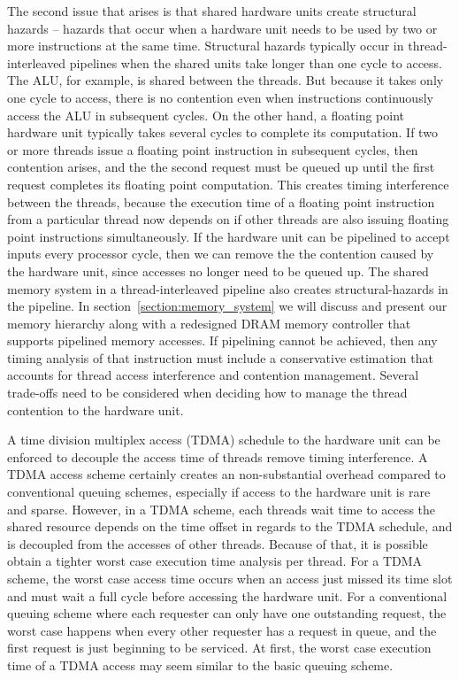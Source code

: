 The second issue that arises is that shared hardware units create structural hazards -- hazards that occur when a hardware unit needs to be used by two or more instructions at the same time.
Structural hazards typically occur in thread-interleaved pipelines when the shared units take longer than one cycle to access. 
The ALU, for example, is shared between the threads.
But because it takes only one cycle to access, there is no contention even when instructions continuously access the ALU in subsequent cycles.
On the other hand, a floating point hardware unit typically takes several cycles to complete its computation.
If two or more threads issue a floating point instruction in subsequent cycles, then contention arises, and the the second request must be queued up until the first request completes its floating point computation.   
This creates timing interference between the threads, because the execution time of a floating point instruction from a particular thread now depends on if other threads are also issuing floating point instructions simultaneously. 
If the hardware unit can be pipelined to accept inputs every processor cycle, then we can remove the the contention caused by the hardware unit, since accesses no longer need to be queued up.
The shared memory system in a thread-interleaved pipeline also creates structural-hazards in the pipeline.
In section~\ref{section:memory_system} we will discuss and present our memory hierarchy along with a redesigned DRAM memory controller that supports pipelined memory accesses.
If pipelining cannot be achieved, then any timing analysis of that instruction must include a conservative estimation that accounts for thread access interference and contention management.
Several trade-offs need to be considered when deciding how to manage the thread contention to the hardware unit.

A time division multiplex access (TDMA) schedule to the hardware unit can be enforced to decouple the access time of threads remove timing interference.
A TDMA access scheme certainly creates an non-substantial overhead compared to conventional queuing schemes, especially if access to the hardware unit is rare and sparse.
However, in a TDMA scheme, each threads wait time to access the shared resource depends on the time offset in regards to the TDMA schedule, and is decoupled from the accesses of other threads.
Because of that, it is possible obtain a tighter worst case execution time analysis per thread.
For a TDMA scheme, the worst case access time occurs when an access just missed its time slot and must wait a full cycle before accessing the hardware unit.
For a conventional queuing scheme where each requester can only have one outstanding request, the worst case happens when every other requester has a request in queue, and the first request is just beginning to be serviced.   
At first, the worst case execution time of a TDMA access may seem similar to the basic queuing scheme.


